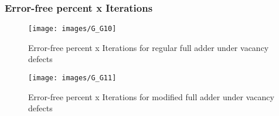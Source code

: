 \subsubsection{Error-free percent x Iterations}

\begin{figure}[h!]
\center
\texttt{[image: images/G\_G10]}
\caption{Error-free percent x Iterations for regular full adder under vacancy defects}
\label{figure:full_reg_gt5}
\end{figure}

\begin{figure}[h!]
\center
\texttt{[image: images/G\_G11]}
\caption{Error-free percent x Iterations for modified full adder under vacancy defects}
\label{figure:full_mod_gt5}
\end{figure}
\pagebreak